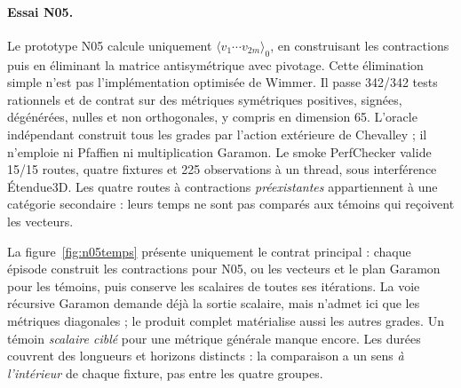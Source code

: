 \documentclass[11pt,a4paper]{article}
\begin{document}
\paragraph{Essai N05.}
\label{sec:n05perf}
Le prototype N05 calcule uniquement
$\langle v_1\cdots v_{2m}\rangle_0$, en construisant les contractions
puis en éliminant la matrice antisymétrique avec
pivotage. Cette élimination simple n'est pas l'implémentation
optimisée de Wimmer. Il passe 342/342 tests rationnels et de contrat sur
des métriques symétriques positives, signées, dégénérées, nulles et non
orthogonales, y compris en dimension 65. L'oracle indépendant construit
tous les grades par l'action extérieure de Chevalley ; il n'emploie ni
Pfaffien ni multiplication Garamon. Le smoke PerfChecker valide 15/15
routes, quatre fixtures et 225 observations à un thread, sous
interférence Étendue3D. Les quatre routes à contractions
\emph{préexistantes} appartiennent à une catégorie secondaire : leurs
temps ne sont pas comparés aux témoins qui reçoivent les vecteurs.

La figure~\ref{fig:n05temps} présente uniquement le contrat principal :
chaque épisode construit les contractions pour N05, ou les vecteurs et
le plan Garamon pour les témoins, puis conserve les scalaires de toutes
ses itérations. La voie récursive Garamon demande déjà la sortie
scalaire, mais n'admet ici que les métriques diagonales ; le produit
complet matérialise aussi les autres grades. Un témoin \emph{scalaire
ciblé} pour une métrique générale manque encore. Les durées couvrent
des longueurs et horizons distincts : la comparaison a un sens
\emph{à l'intérieur} de chaque fixture, pas entre les quatre groupes.
\end{document}
